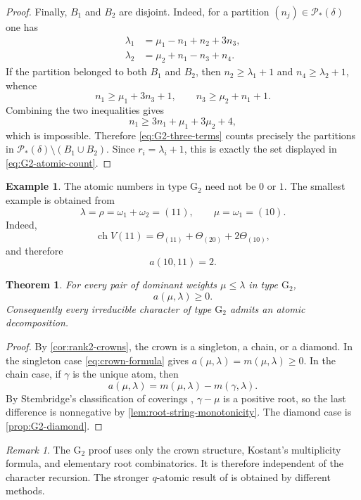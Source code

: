 \documentclass[11pt]{article}
\newtheorem{theorem}{Theorem}[section]
\theoremstyle{definition}
\newtheorem{example}[example]{Example}
\theoremstyle{remark}
\newtheorem{remark}[remark]{Remark}
\newcommand{\chr}{\operatorname{ch}}
\newcommand{\typeG}{\ensuremath{\mathrm{G}}}
\begin{document}
\begin{proof}
Finally, $B_1$ and $B_2$ are disjoint.  Indeed, for a partition
$(n_j)\in\mathcal P_*(\delta)$ one has
\begin{align*}
 \lambda_1&=\mu_1-n_1+n_2+3n_3,\\
 \lambda_2&=\mu_2+n_1-n_3+n_4.
\end{align*}
If the partition belonged to both $B_1$ and $B_2$, then
$n_2\ge\lambda_1+1$ and $n_4\ge\lambda_2+1$, whence
\[
       n_1\ge\mu_1+3n_3+1,
       \qquad
       n_3\ge\mu_2+n_1+1.
\]
Combining the two inequalities gives
\[
       n_1\ge3n_1+\mu_1+3\mu_2+4,
\]
which is impossible.  Therefore \eqref{eq:G2-three-terms} counts precisely the
partitions in $\mathcal P_*(\delta)\setminus(B_1\cup B_2)$.  Since
$r_i=\lambda_i+1$, this is exactly the set displayed in
\eqref{eq:G2-atomic-count}.
\end{proof}

\begin{example}\label{ex:G2-coefficient-two}
The atomic numbers in type $\typeG_2$ need not be $0$ or $1$.  The smallest example is
obtained from
\[
   \lambda=\rho=\omega_1+\omega_2=(11),
   \qquad
   \mu=\omega_1=(10).
\]
Indeed,
\[
   \chr V(11)=\Theta_{(11)}+\Theta_{(20)}+2\Theta_{(10)},
\]
and therefore
\[
   a(10,11)=2.
\]
\end{example}

\begin{theorem}\label{thm:G2-atomic}
For every pair of dominant weights $\mu\le\lambda$ in type $\typeG_2$,
\[
             a(\mu,\lambda)\ge0.
\]
Consequently every irreducible character of type $\typeG_2$ admits an atomic
decomposition.
\end{theorem}

\begin{proof}
By \cref{cor:rank2-crowns}, the crown is a singleton, a chain, or a diamond.
In the singleton case \eqref{eq:crown-formula} gives
$a(\mu,\lambda)=m(\mu,\lambda)\ge0$.  In the chain case, if $\gamma$ is the
unique atom, then
\[
        a(\mu,\lambda)=m(\mu,\lambda)-m(\gamma,\lambda).
\]
By Stembridge's classification of coverings
\cite[Theorem~2.8]{Stembridge}, $\gamma-\mu$ is a positive root, so the last
difference is nonnegative by \cref{lem:root-string-monotonicity}.  The diamond
case is \cref{prop:G2-diamond}.
\end{proof}

\begin{remark}
The $\typeG_2$ proof uses only the crown structure, Kostant's multiplicity formula,
and elementary root combinatorics.  It is therefore independent of the
character recursion.  The stronger $q$-atomic result of
\cite{Muniz-Plaza-Rojas-G2} is obtained by different methods.
\end{remark}
\end{document}
